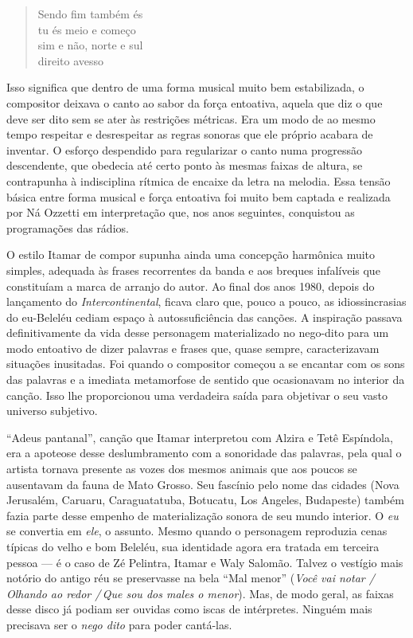 \begin{verse}
\small{Sendo fim também és\\
tu és meio e começo\\
sim e não, norte e sul\\
direito avesso}
\end{verse}

Isso significa que dentro de uma forma musical muito bem estabilizada, o
compositor deixava o canto ao sabor da força entoativa, aquela que diz o
que deve ser dito sem se ater às restrições métricas. Era um modo de ao
mesmo tempo respeitar e desrespeitar as regras sonoras que ele próprio
acabara de inventar. O esforço despendido para regularizar o canto numa
progressão descendente, que obedecia até certo ponto às mesmas faixas de
altura, se contrapunha à indisciplina rítmica de encaixe da letra na
melodia. Essa tensão básica entre forma musical e força entoativa foi
muito bem captada e realizada por Ná Ozzetti em interpretação que, nos
anos seguintes, conquistou as programações das rádios.

O estilo Itamar de compor supunha ainda uma concepção harmônica muito
simples, adequada às frases recorrentes da banda e aos breques
infalíveis que constituíam a marca de arranjo do autor. Ao final dos
anos 1980, depois do lançamento do \textit{Intercontinental}, ficava claro que,
pouco a pouco, as idiossincrasias do eu-Beleléu cediam espaço à
autossuficiência das canções. A inspiração passava definitivamente da
vida desse personagem materializado no nego-dito para um modo entoativo
de dizer palavras e frases que, quase sempre, caracterizavam situações
inusitadas. Foi quando o compositor começou a se encantar com os sons
das palavras e a imediata metamorfose de sentido que ocasionavam no
interior da canção. Isso lhe proporcionou uma verdadeira saída para
objetivar o seu vasto universo subjetivo.

``Adeus pantanal'', canção que Itamar interpretou com Alzira e Tetê
Espíndola, era a apoteose desse deslumbramento com a sonoridade das
palavras, pela qual o artista tornava presente as vozes dos mesmos
animais que aos poucos se ausentavam da fauna de Mato Grosso. Seu
fascínio pelo nome das cidades (Nova Jerusalém, Caruaru, Caraguatatuba,
Botucatu, Los Angeles, Budapeste) também fazia parte desse empenho de
materialização sonora de seu mundo interior. O \textit{eu} se convertia em
\textit{ele}, o assunto. Mesmo quando o personagem reproduzia cenas típicas
do velho e bom Beleléu, sua identidade agora era tratada em terceira
pessoa --- é o caso de Zé Pelintra, Itamar e Waly Salomão. Talvez o
vestígio mais notório do antigo réu se preservasse na bela ``Mal menor''
(\textit{Você vai notar /\,Olhando ao redor /\,Que sou dos males o menor}).
Mas, de modo geral, as faixas desse disco já podiam ser ouvidas como
iscas de intérpretes. Ninguém mais precisava ser o \textit{nego dito} para poder
cantá-las.

